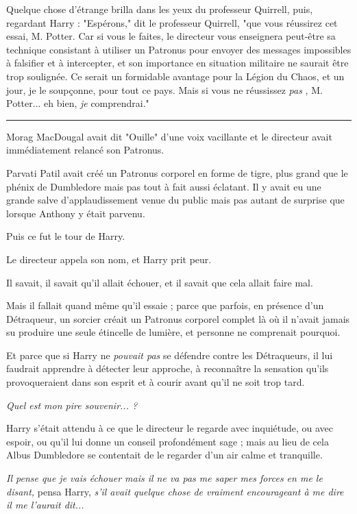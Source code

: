 Quelque chose d'étrange brilla dans les yeux du professeur Quirrell, puis, regardant Harry : "Espérons," dit le professeur Quirrell, "que vous réussirez cet essai, M. Potter. Car si vous le faites, le directeur vous enseignera peut-être sa technique consistant à utiliser un Patronus pour envoyer des messages impossibles à falsifier et à intercepter, et son importance en situation militaire ne saurait être trop soulignée. Ce serait un formidable avantage pour la Légion du Chaos, et un jour, je le soupçonne, pour tout ce pays. Mais si vous ne réussissez \emph{pas} , M. Potter... eh bien, \emph{je}  comprendrai."
\par\noindent\rule{\textwidth}{0.4pt}
Morag MacDougal avait dit "Ouille" d'une voix vacillante et le directeur avait immédiatement relancé son Patronus.

Parvati Patil avait créé un Patronus corporel en forme de tigre, plus grand que le phénix de Dumbledore mais pas tout à fait aussi éclatant. Il y avait eu une grande salve d'applaudissement venue du public mais pas autant de surprise que lorsque Anthony y était parvenu.

Puis ce fut le tour de Harry.

Le directeur appela son nom, et Harry prit peur.

Il savait, il savait qu'il allait échouer, et il savait que cela allait faire mal.

Mais il fallait quand même qu'il essaie ; parce que parfois, en présence d'un Détraqueur, un sorcier créait un Patronus corporel complet là où il n'avait jamais su produire une seule étincelle de lumière, et personne ne comprenait pourquoi.

Et parce que si Harry ne \emph{pouvait pas}  se défendre contre les Détraqueurs, il lui faudrait apprendre à détecter leur approche, à reconnaître la sensation qu'ils provoqueraient dans son esprit et à courir avant qu'il ne soit trop tard.

\emph{Quel est mon pire souvenir... ?} 

Harry s'était attendu à ce que le directeur le regarde avec inquiétude, ou avec espoir, ou qu'il lui donne un conseil profondément sage ; mais au lieu de cela Albus Dumbledore se contentait de le regarder d'un air calme et tranquille.

\emph{Il pense que je vais échouer mais il ne va pas me saper mes forces en me le disant, } pensa Harry, \emph{s'il avait quelque chose de vraiment encourageant à me dire il me l'aurait dit...} 

